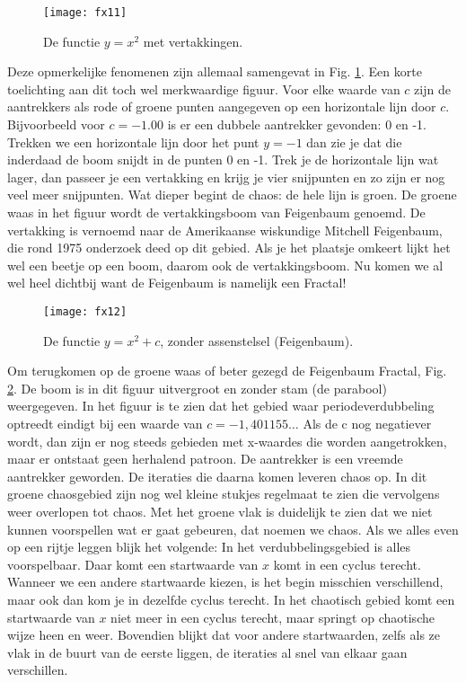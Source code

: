\documentclass[11pt,fleqn]{book} %
\begin{document}
\begin{figure}[h]
	\centering\texttt{[image: fx11]}
	\caption{De functie $y=x^2$ met vertakkingen.}
	\label{fig:fx11}
\end{figure}
Deze opmerkelijke fenomenen zijn allemaal samengevat in Fig. \ref{fig:fx11}. Een korte toelichting aan dit toch wel merkwaardige figuur. Voor elke waarde van $c$ zijn de aantrekkers als rode of groene punten aangegeven op een horizontale lijn door $c$. Bijvoorbeeld voor $c = -1.00$ is er een dubbele aantrekker gevonden: 0 en -1. Trekken we een horizontale lijn door het punt $y = -1$ dan zie je dat die inderdaad de boom snijdt in de punten 0 en -1. 
Trek je de horizontale lijn wat lager, dan passeer je een vertakking en krijg je vier snijpunten en zo zijn er nog veel meer snijpunten.
Wat dieper begint de chaos: de hele lijn is groen. 
De groene waas in het figuur wordt de vertakkingsboom van Feigenbaum genoemd. De vertakking is vernoemd naar de Amerikaanse wiskundige Mitchell Feigenbaum, die rond 1975 onderzoek deed op dit gebied. Als je het plaatsje omkeert lijkt het wel een beetje op een boom, daarom ook de vertakkingsboom. Nu komen we al wel heel dichtbij want de Feigenbaum is namelijk een Fractal!
\begin{figure}[h]
	\centering\texttt{[image: fx12]}
	\caption{De functie $y=x^2+c$, zonder assenstelsel (Feigenbaum).}
	\label{fig:fx12}
\end{figure}
Om terugkomen op de groene waas of beter gezegd de Feigenbaum Fractal, Fig. \ref{fig:fx12}. De boom is in dit figuur uitvergroot en zonder stam (de parabool) weergegeven. In het figuur is te zien dat het gebied waar periodeverdubbeling optreedt eindigt bij een waarde van $c = -1,401155\ldots$ 
Als de c nog negatiever wordt, dan zijn er nog steeds gebieden met x-waardes die worden aangetrokken, maar er ontstaat geen herhalend patroon. De aantrekker is een vreemde aantrekker geworden. De iteraties die daarna komen leveren chaos op. In dit groene chaosgebied zijn nog wel kleine stukjes regelmaat te zien die vervolgens weer overlopen tot chaos. Met het groene vlak is duidelijk te zien dat we niet kunnen voorspellen wat er gaat gebeuren, dat noemen we chaos. 
Als we alles even op een rijtje leggen blijk het volgende: 
In het verdubbelingsgebied is alles voorspelbaar. Daar komt een startwaarde van $x$ komt in een cyclus terecht. Wanneer we een andere startwaarde kiezen, is het begin misschien  verschillend, maar ook dan kom je in dezelfde cyclus terecht. In het chaotisch gebied komt een startwaarde van $x$ niet meer in een cyclus terecht, maar springt op chaotische wijze heen en weer.
Bovendien blijkt dat voor andere startwaarden, zelfs als ze vlak in de buurt van de eerste liggen, de iteraties al snel van elkaar gaan verschillen.
\end{document}

